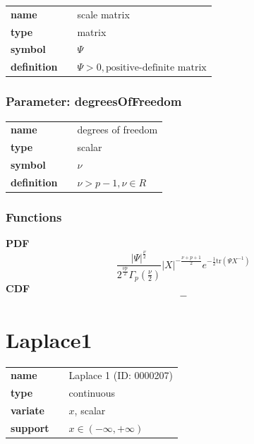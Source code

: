 \noindent\begin{tabular}{p{2cm}cl}
\textbf{name} & & scale matrix \\
\textbf{type} & & matrix \\
\textbf{symbol} & & $\Psi$  \\
\textbf{definition} & & $\Psi > 0, \text{positive-definite matrix}$
\end{tabular}
\subsubsection*{Parameter: degreesOfFreedom}

\noindent\begin{tabular}{p{2cm}cl}
\textbf{name} & & degrees of freedom \\
\textbf{type} & & scalar \\
\textbf{symbol} & & $\nu$  \\
\textbf{definition} & & $\nu > p-1, \nu \in  R$
\end{tabular}
\subsubsection*{Functions}

\smallskip \noindent \hspace{.2cm} \textbf{PDF} 
\begin{equation*}\frac{\left|\Psi\right|^{\frac{\nu}{2}}}{2^{\frac{\nu p}{2}}\Gamma_p(\frac{\nu}{2})} \left|X\right|^{-\frac{\nu+p+1}{2}}e^{-\frac{1}{2}\text{tr}(\Psi X^{-1})}\end{equation*}
\smallskip \noindent \hspace{.2cm} \textbf{CDF} 
\begin{equation*}-\end{equation*}
\smallskip\section*{Laplace1} 

  \bigskip 

\begin{tabular}{p{2cm}cl}
\textbf{name} & & Laplace 1 (ID: 0000207)\\ 
 
\textbf{type} & & continuous \\ 

\textbf{variate} & & $x$, scalar \\ 

\textbf{support} & & $x \in (-\infty,+\infty)$
\end{tabular}

